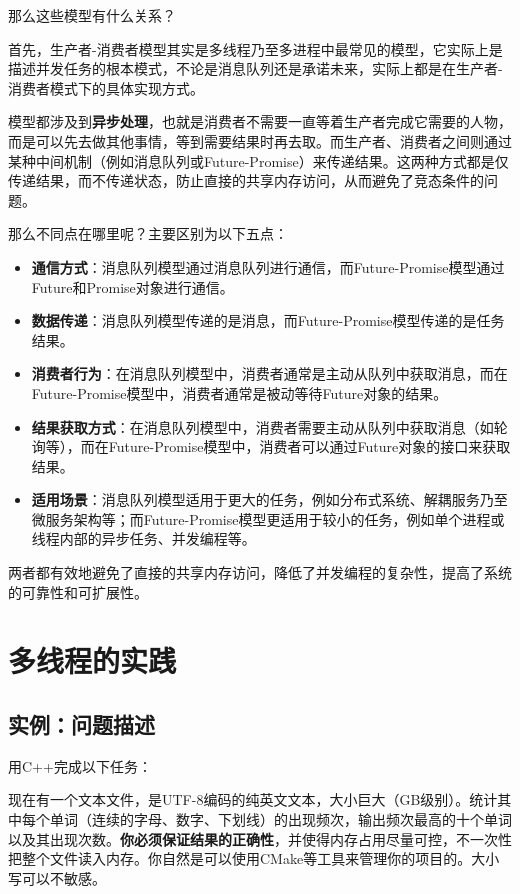 那么这些模型有什么关系？

首先，生产者-消费者模型其实是多线程乃至多进程中最常见的模型，它实际上是描述并发任务的根本模式，不论是消息队列还是承诺未来，实际上都是在生产者-消费者模式下的具体实现方式。

模型都涉及到\textbf{异步处理}，也就是消费者不需要一直等着生产者完成它需要的人物，而是可以先去做其他事情，等到需要结果时再去取。而生产者、消费者之间则通过某种中间机制（例如消息队列或Future-Promise）来传递结果。这两种方式都是仅传递结果，而不传递状态，防止直接的共享内存访问，从而避免了竞态条件的问题。

那么不同点在哪里呢？主要区别为以下五点：
\begin{itemize}
    \item \textbf{通信方式}：消息队列模型通过消息队列进行通信，而Future-Promise模型通过Future和Promise对象进行通信。
    \item \textbf{数据传递}：消息队列模型传递的是消息，而Future-Promise模型传递的是任务结果。
    \item \textbf{消费者行为}：在消息队列模型中，消费者通常是主动从队列中获取消息，而在Future-Promise模型中，消费者通常是被动等待Future对象的结果。
    \item \textbf{结果获取方式}：在消息队列模型中，消费者需要主动从队列中获取消息（如轮询等），而在Future-Promise模型中，消费者可以通过Future对象的接口来获取结果。
    \item \textbf{适用场景}：消息队列模型适用于更大的任务，例如分布式系统、解耦服务乃至微服务架构等；而Future-Promise模型更适用于较小的任务，例如单个进程或线程内部的异步任务、并发编程等。
\end{itemize}

两者都有效地避免了直接的共享内存访问，降低了并发编程的复杂性，提高了系统的可靠性和可扩展性。

\section{多线程的实践}

\subsection{实例：问题描述}

用C++完成以下任务：

现在有一个文本文件，是UTF-8编码的纯英文文本，大小巨大（GB级别）。统计其中每个单词（连续的字母、数字、下划线）的出现频次，输出频次最高的十个单词以及其出现次数。\textbf{你必须保证结果的正确性}，并使得内存占用尽量可控，不一次性把整个文件读入内存。你自然是可以使用CMake等工具来管理你的项目的。大小写可以不敏感。

